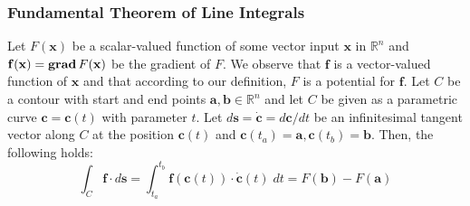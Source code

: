 \subsubsection{Fundamental Theorem of Line Integrals}
Let $F(\mathbf{x})$ be a scalar-valued function of some vector input $\mathbf{x}$ in $\mathbb{R}^n$ and $\mathbf{f(x)} = \operatorname{\mathbf{grad}} F(\mathbf{x})$ be the gradient of $F$. We observe that $\mathbf{f}$ is a vector-valued function of $\mathbf{x}$ and that according to our definition, $F$ is a potential for $\mathbf{f}$. Let $C$ be a contour with start and end points $\mathbf{a,b} \in \mathbb{R}^n$ and let $C$ be given as a parametric curve $\mathbf{c} = \mathbf{c}(t)$ with parameter $t$. Let $d\mathbf{s} = \dot{\mathbf{c}} = d\mathbf{c} / dt$ be an infinitesimal tangent vector along $C$ at the position $\mathbf{c}(t)$ and $\mathbf{c}(t_a) = \mathbf{a}, \mathbf{c}(t_b) = \mathbf{b}$. Then, the following holds:
\begin{equation}
 \int_C \mathbf{f} \cdot d\mathbf{s}  =
 \int_{t_a}^{t_b}  \mathbf{f} (\mathbf{c}(t) ) \cdot \dot{\mathbf{c}}(t) \; dt =
 F(\mathbf{b}) - F(\mathbf{a}) 
\end{equation}
